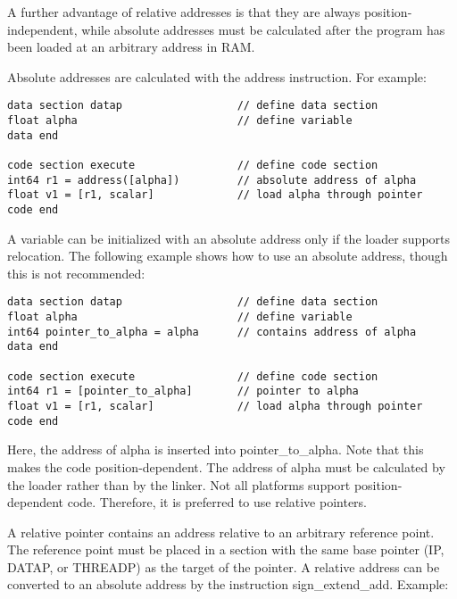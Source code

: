 \documentclass[forwardcom.tex]{subfiles}
\begin{document}
A further advantage of relative addresses is that they are always position-independent, while absolute addresses must be calculated after the program has been loaded at an arbitrary address in RAM.
\vv

Absolute addresses are calculated with the address instruction. For example:

\begin{example}
\label{addressInstruction2Pointer}
\end{example} %
\begin{lstlisting}[frame=single]
data section datap                  // define data section
float alpha                         // define variable
data end

code section execute                // define code section
int64 r1 = address([alpha])         // absolute address of alpha
float v1 = [r1, scalar]             // load alpha through pointer
code end
\end{lstlisting}
\vv

A variable can be initialized with an absolute address only if the loader supports relocation. The following example shows how to use an absolute address, though this is not recommended:

\begin{example}
\label{absolutePointer}
\end{example} %
\begin{lstlisting}[frame=single]
data section datap                  // define data section
float alpha                         // define variable
int64 pointer_to_alpha = alpha      // contains address of alpha
data end

code section execute                // define code section
int64 r1 = [pointer_to_alpha]       // pointer to alpha
float v1 = [r1, scalar]             // load alpha through pointer
code end
\end{lstlisting}
\vv

Here, the address of alpha is inserted into pointer\_to\_alpha. Note that this makes the code position-dependent. The address of alpha must be calculated by the loader rather than by the linker. Not all platforms support position-dependent code. Therefore, it is preferred to use relative pointers.
\vspace{4mm}

A relative pointer contains an address relative to an arbitrary reference point. The reference point must be placed in a section with the same base pointer (IP, DATAP, or THREADP) as the target of the pointer. A relative address can be converted to an absolute address by the instruction sign\_extend\_add. Example:
\end{document}
